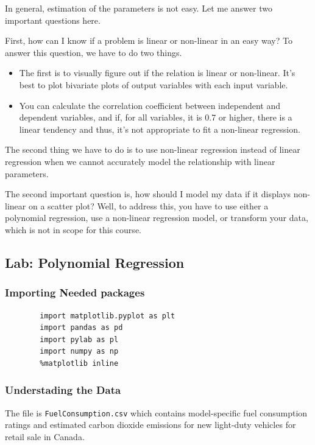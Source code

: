 	In general, estimation of the parameters is not easy. Let me answer two important questions here. 
	
	First, how can I know if a problem is linear or non-linear in an easy way? To answer this question, we have to do two things. 

	\begin{itemize}
		\item The first is to visually figure out if the relation is linear or non-linear. It's best to plot bivariate plots of output variables with each input variable. 
		\item You can calculate the correlation coefficient between independent and dependent variables, and if, for all variables, it is 0.7 or higher, there is a linear tendency and thus, it's not appropriate to fit a non-linear regression. 
	\end{itemize}
	
	
	The second thing we have to do is to use non-linear regression instead of linear regression when we cannot accurately model the relationship with linear parameters. 
	
	The second important question is, how should I model my data if it displays non-linear on a scatter plot? Well, to address this, you have to use either a polynomial regression, use a non-linear regression model, or transform your data, which is not in scope for this course. 
	
	\subsection{Lab: Polynomial Regression}
	
	\subsubsection{Importing Needed packages}
	\begin{verbatim}
		import matplotlib.pyplot as plt
		import pandas as pd
		import pylab as pl
		import numpy as np
		%matplotlib inline
	\end{verbatim}

	\subsubsection{Understading the Data}
	The file is \texttt{FuelConsumption.csv} which contains model-specific fuel consumption ratings and estimated carbon dioxide emissions for new light-duty vehicles for retail sale in Canada.
	
